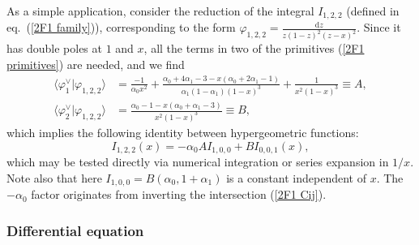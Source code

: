 \documentclass[11pt]{article}
\renewcommand{\d}{\text{d}}
\newcommand{\be}{\begin{equation}}
\newcommand{\ee}{\end{equation}}
\newcommand{\braket}[2]{\big\langle{#1}|{#2}\big\rangle}
\newcommand{\dual}{\vee}
\newcommand{\vphi}{\varphi}
\begin{document}
As a simple application, consider the reduction of the integral $I_{1,2,2}$ (defined in eq.~(\ref{2F1 family})),
corresponding to the form $\vphi_{1,2,2} = \frac{\d z}{z(1-z)^2(z-x)^2}$.
Since it has double poles at $1$ and $x$, all the terms in two of the primitives (\ref{2F1 primitives}) are needed, and we find
\be\begin{aligned}
 \braket{\vphi_1^\dual}{\vphi_{1,2,2}} &= \frac{-1}{\alpha_0 x^2} + \frac{\alpha_0+4\alpha_1-3-x(\alpha_0+2\alpha_1-1)}{\alpha_1(1-\alpha_1)(1-x)^3}+\frac{1}{x^2(1-x)^3} \equiv A,
\\
 \braket{\vphi_2^\dual}{\vphi_{1,2,2}} &= \frac{\alpha_0 - 1 - x (\alpha_0 + \alpha_1 - 3)}{x^2 (1 - x)^3} \equiv B,
\end{aligned}
\ee
which implies the following identity between hypergeometric functions:
\be
 I_{1,2,2}(x) = -\alpha_0A I_{1,0,0} + B I_{0,0,1}(x),
\ee
which may be tested directly via numerical integration or series expansion in $1/x$.
Note also that here $I_{1,0,0}=B(\alpha_0,1+\alpha_1)$ is a constant independent of $x$.
The $-\alpha_0$ factor originates from inverting the intersection (\ref{2F1 Cij}).

\subsubsection{Differential equation}
\end{document}
